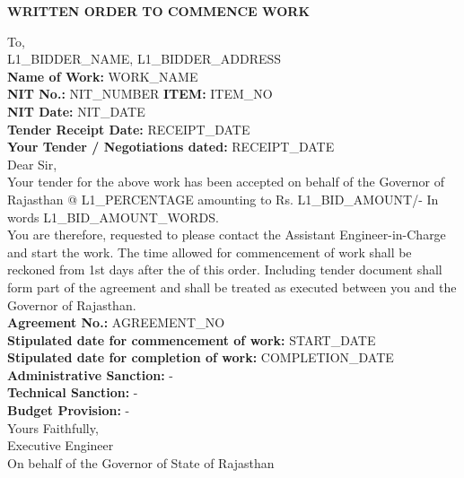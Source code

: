 \documentclass[a4paper]{article}
\begin{document}
\begin{center}
    \textbf{WRITTEN ORDER TO COMMENCE WORK}
\end{center}

To, \\
{L1_BIDDER_NAME}, {L1_BIDDER_ADDRESS} \\

\vspace{0.5cm}
\textbf{Name of Work:} {WORK_NAME} \\
\textbf{NIT No.:} {NIT_NUMBER} \quad \textbf{ITEM:} {ITEM_NO} \\
\textbf{NIT Date:} {NIT_DATE} \\
\textbf{Tender Receipt Date:} {RECEIPT_DATE} \\
\textbf{Your Tender / Negotiations dated:} {RECEIPT_DATE} \\

Dear Sir, \\

Your tender for the above work has been accepted on behalf of the Governor of Rajasthan @ {L1_PERCENTAGE} amounting to Rs. {L1_BID_AMOUNT}/- In words {L1_BID_AMOUNT_WORDS}. \\

You are therefore, requested to please contact the Assistant Engineer-in-Charge and start the work. The time allowed for commencement of work shall be reckoned from 1st days after the of this order. Including tender document shall form part of the agreement and shall be treated as executed between you and the Governor of Rajasthan. \\

\textbf{Agreement No.:} {AGREEMENT_NO} \\
\textbf{Stipulated date for commencement of work:} {START_DATE} \\
\textbf{Stipulated date for completion of work:} {COMPLETION_DATE} \\
\textbf{Administrative Sanction:} - \\
\textbf{Technical Sanction:} - \\
\textbf{Budget Provision:} - \\

Yours Faithfully, \\
\vspace{0.5cm}
Executive Engineer \\
On behalf of the Governor of State of Rajasthan \\
\end{document}
